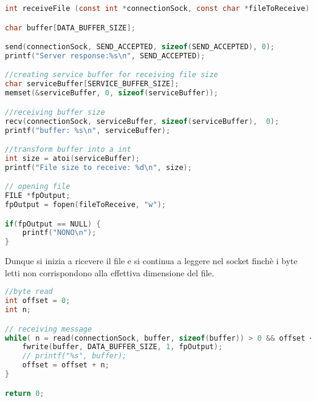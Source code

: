 \documentclass[11pt,fleqn]{book} %
\begin{document}
\begin{lstlisting}[language=C]
int receiveFile (const int *connectionSock, const char *fileToReceive) {

char buffer[DATA_BUFFER_SIZE];

send(connectionSock, SEND_ACCEPTED, sizeof(SEND_ACCEPTED), 0);
printf("Server response:%s\n", SEND_ACCEPTED);

//creating service buffer for receiving file size
char serviceBuffer[SERVICE_BUFFER_SIZE];
memset(&serviceBuffer, 0, sizeof(serviceBuffer));

//receiving buffer size
recv(connectionSock, serviceBuffer, sizeof(serviceBuffer),  0);
printf("buffer: %s\n", serviceBuffer);

//transform buffer into a int
int size = atoi(serviceBuffer);
printf("File size to receive: %d\n", size);

// opening file
FILE *fpOutput;
fpOutput = fopen(fileToReceive, "w");

if(fpOutput == NULL) {
	printf("NONO\n");
}

\end{lstlisting}

Dunque si inizia a ricevere il file e si continua a leggere nel socket finchè i byte letti non corrispondono alla effettiva dimensione del file.

\begin{lstlisting}[language=C]
//byte read
int offset = 0;
int n;

// receiving message
while( n = read(connectionSock, buffer, sizeof(buffer)) > 0 && offset < size) {
	fwrite(buffer, DATA_BUFFER_SIZE, 1, fpOutput);
	// printf("%s", buffer);
	offset = offset + n;
}

return 0;

\end{lstlisting}
\end{document}
